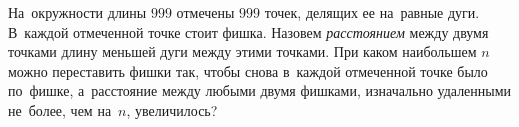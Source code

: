 \begin{problems}
\item
На~окружности длины $999$ отмечены $999$ точек, делящих ее на~равные дуги.
В~каждой отмеченной точке стоит фишка.
Назовем \emph{расстоянием} между двумя точками длину меньшей дуги между этими
точками.
При каком наибольшем $n$ можно переставить фишки так, чтобы снова в~каждой
отмеченной точке было по~фишке, а~расстояние между любыми двумя фишками,
изначально удаленными не~более, чем на~$n$, увеличилось?

\end{problems}

